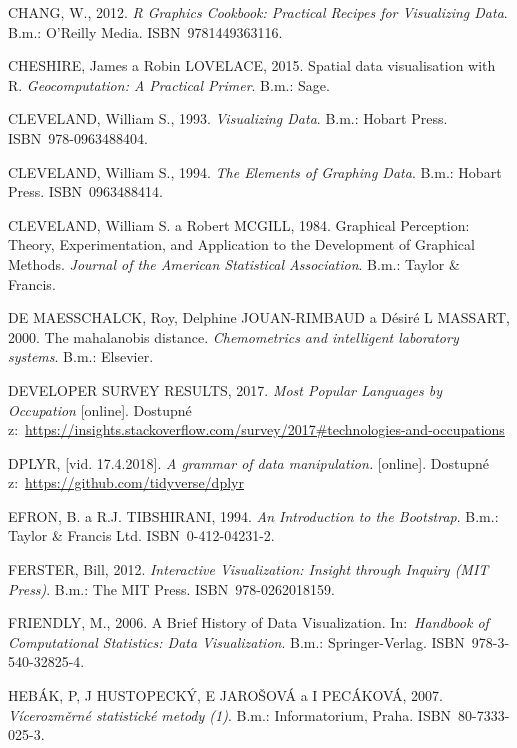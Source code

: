 \documentclass[12pt,]{article}
\begin{document}
\hypertarget{ref-chang2012}{}
CHANG, W., 2012. \emph{R Graphics Cookbook: Practical Recipes for
Visualizing Data}. B.m.: O'Reilly Media. ISBN~9781449363116.

\hypertarget{ref-spatial}{}
CHESHIRE, James a Robin LOVELACE, 2015. Spatial data visualisation with
R. \emph{Geocomputation: A Practical Primer}. B.m.: Sage.

\hypertarget{ref-cleveland1993}{}
CLEVELAND, William S., 1993. \emph{Visualizing Data}. B.m.: Hobart
Press. ISBN~978-0963488404.

\hypertarget{ref-cleveland1994}{}
CLEVELAND, William S., 1994. \emph{The Elements of Graphing Data}. B.m.:
Hobart Press. ISBN~0963488414.

\hypertarget{ref-cleveland_mcgill}{}
CLEVELAND, William S. a Robert MCGILL, 1984. Graphical Perception:
Theory, Experimentation, and Application to the Development of Graphical
Methods. \emph{Journal of the American Statistical Association}. B.m.:
Taylor \& Francis.

\hypertarget{ref-mbdist2}{}
DE MAESSCHALCK, Roy, Delphine JOUAN-RIMBAUD a Désiré L MASSART, 2000.
The mahalanobis distance. \emph{Chemometrics and intelligent laboratory
systems}. B.m.: Elsevier.

\hypertarget{ref-stackover}{}
DEVELOPER SURVEY RESULTS, 2017. \emph{Most Popular Languages by
Occupation} {[}online{]}. Dostupné
z:~\url{https://insights.stackoverflow.com/survey/2017\#technologies-and-occupations}

\hypertarget{ref-dplyr}{}
DPLYR, {[}vid. 17.4.2018{]}. \emph{A grammar of data manipulation.}
{[}online{]}. Dostupné z:~\url{https://github.com/tidyverse/dplyr}

\hypertarget{ref-bootstrap}{}
EFRON, B. a R.J. TIBSHIRANI, 1994. \emph{An Introduction to the
Bootstrap}. B.m.: Taylor \& Francis Ltd. ISBN~0-412-04231-2.

\hypertarget{ref-ferster}{}
FERSTER, Bill, 2012. \emph{Interactive Visualization: Insight through
Inquiry (MIT Press)}. B.m.: The MIT Press. ISBN~978-0262018159.

\hypertarget{ref-dataviz_history}{}
FRIENDLY, M., 2006. A Brief History of Data Visualization.
In:~\emph{Handbook of Computational Statistics: Data Visualization}.
B.m.: Springer-Verlag. ISBN~978-3-540-32825-4.

\hypertarget{ref-vicerozm_stat}{}
HEBÁK, P, J HUSTOPECKÝ, E JAROŠOVÁ a I PECÁKOVÁ, 2007.
\emph{Vícerozměrné statistické metody (1)}. B.m.: Informatorium, Praha.
ISBN~80-7333-025-3.
\end{document}
